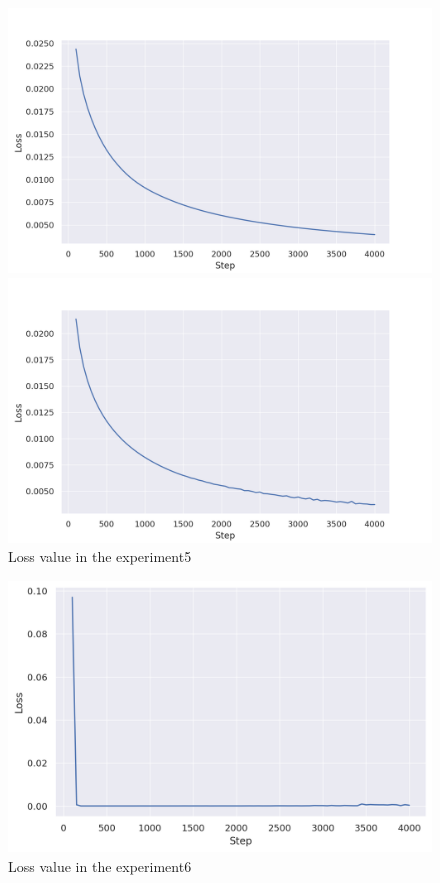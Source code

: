 \begin{figure}[h]
  \begin{minipage}[b]{0.45\linewidth}
    \centering
    \includegraphics[keepaspectratio, scale=0.4]{images/mazemaze_1.png}
    \subcaption{}
  \end{minipage}
  \begin{minipage}[b]{0.45\linewidth}
    \centering
    \includegraphics[keepaspectratio, scale=0.4]{images/mazemaze_8.png}
    \subcaption{}
  \end{minipage}
\caption{Loss value in the experiment5}
\label{Fig:loss5}
\end{figure}

\begin{figure}[h]
  \centering
  \includegraphics[keepaspectratio, scale=0.4]{images/9cam_19.png}
  \caption{Loss value in the experiment6}
  \label{Fig:loss6}
\end{figure}

